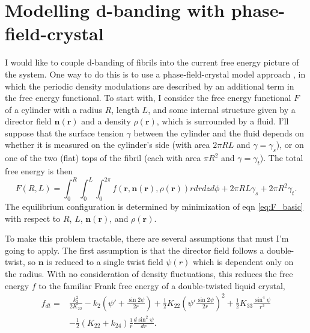 \documentclass[12pt]{article}
\begin{document}


\section{Modelling d-banding with phase-field-crystal}
I would like to couple d-banding of fibrils into the current free energy picture of the system. One way to do this is to use a phase-field-crystal model approach \cite{Elder:2004ct}, in which the periodic density modulations are described by an additional term in the free energy functional. To start with, I consider the free energy functional $F$ of a cylinder with a radius $R$, length $L$, and some internal structure given by a director field $\bm{n}(\bm{r})$ and a density $\rho(\bm{r})$, which is surrounded by a fluid. I'll suppose that the surface tension $\gamma$ between the cylinder and the fluid depends on whether it is measured on the cylinder's side (with area $2\pi R L$ and $\gamma=\gamma_s$), or on one of the two (flat) tops of the fibril (each with area $\pi R^2$ and $\gamma=\gamma_t$). The total free energy is then
\begin{equation}\label{eq:F_basic}
F(R,L)=\int_0^R\int_0^L\int_0^{2\pi}f(\bm{r},\bm{n}(\bm{r}),\rho(\bm{r}))rdrdzd\phi+2\pi RL\gamma_s+2\pi R^2\gamma_t.
\end{equation}
The equilibrium configuration is determined by minimization of eqn \ref{eq:F_basic} with respect to $R$, $L$, $\bm{n}(\bm{r})$, and $\rho(\bm{r})$.

To make this problem tractable, there are several assumptions that must I'm going to apply. The first assumption is that the director field follows a double-twist, so $\bm{n}$ is reduced to a single twist field $\psi(r)$ which is dependent only on the radius. With no consideration of density fluctuations, this reduces the free energy $f$ to the familiar Frank free energy of a double-twisted liquid crystal,
\begin{align}\label{eq:frank}
f_{dt}=&\frac{k_{2}^2}{2K_{22}}-k_2\left(\psi'+\frac{\sin2\psi}{2r}\right)+\frac{1}{2}K_{22}\left(\psi'\frac{\sin2\psi}{2r}\right)^2+\frac{1}{2}K_{33}\frac{\sin^4\psi}{r^2}\nonumber\\
&-\frac{1}{2}\left(K_{22}+k_{24}\right)\frac{1}{r}\frac{d\sin^2\psi}{dr}.
\end{align}
\end{document}
